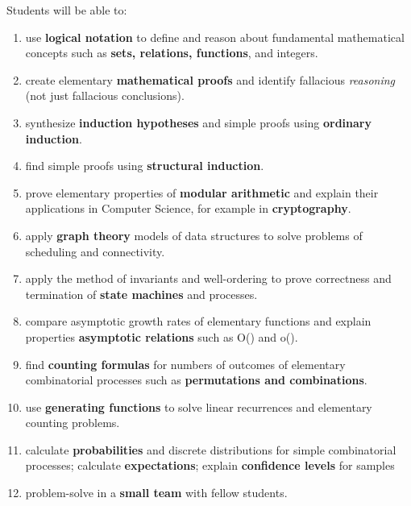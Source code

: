 \documentclass[handout]{mcs}
\begin{document}
Students will be able to:
\begin{enumerate}

\item \label{basic} use \textbf{logical notation} to define and reason
  about fundamental mathematical concepts such as \textbf{sets,
    relations, functions}, and integers.\hfill \brule{0.5in}


\item \label{proofs} create elementary \textbf{mathematical
proofs} and identify fallacious \emph{reasoning} (not just fallacious
conclusions).  \hfill \brule{0.5in}

\item \label{induction} synthesize \textbf{induction hypotheses} and
  simple proofs using \textbf{ordinary induction}.  \hfill
  \brule{0.5in}

\item \label{structural induction} find simple proofs using
  \textbf{structural induction}.  \hfill \brule{0.5in}

\item \label{arithmetic} prove elementary properties of \textbf{modular
arithmetic} and explain their applications in Computer Science,
for example in \textbf{cryptography}.\hfill \brule{0.5in}

\item \label{graphs} apply \textbf{graph theory} models of data
  structures to solve problems of scheduling and connectivity.  \hfill
  \brule{0.5in}

\item \label{invariants} apply the method of invariants and
  well-ordering to prove correctness and termination of \textbf{state
    machines} and processes.  \hfill \brule{0.5in}

\item \label{asymptotics} compare asymptotic growth rates of
  elementary functions and explain properties \textbf{asymptotic
    relations} such as O() and o().

\item \label{counting} find \textbf{counting formulas} for numbers of
  outcomes of elementary combinatorial processes such as
  \textbf{permutations and combinations}. \hfill \brule{0.5in}

\item\label{generating functions} use \textbf{generating functions} to solve
  linear recurrences and elementary counting problems.
  \hfill \brule{0.5in}

\item \label{probability} calculate \textbf{probabilities} and
  discrete distributions for simple combinatorial processes; calculate
  \textbf{expectations}; explain \textbf{confidence levels} for
  samples \hfill \brule{0.5in}

\item \label{student teams} problem-solve in a \textbf{small team} with
fellow students.  \hfill \brule{0.5in}

\end{enumerate}
\end{document}
